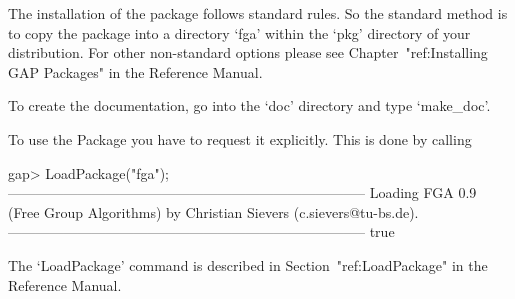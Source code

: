 


The installation of the {\FGA} package follows standard {\GAP} rules.
So the standard method is to copy the package into a directory `fga'
within the `pkg' directory of your {\GAP} distribution.  For other
non-standard options please see Chapter~"ref:Installing GAP Packages"
in the {\GAP} Reference Manual.

To create the documentation, go into the `doc' directory and type
`make_doc'.


To use the {\FGA} Package you have to request it explicitly. This  is
done by calling

\beginexample
gap> LoadPackage("fga");
-----------------------------------------------------------------------------
Loading  FGA 0.9 (Free Group Algorithms)
by Christian Sievers (c.sievers@tu-bs.de).
-----------------------------------------------------------------------------
true
\endexample

The `LoadPackage' command is described in Section~"ref:LoadPackage"
in the {\GAP} Reference Manual.

